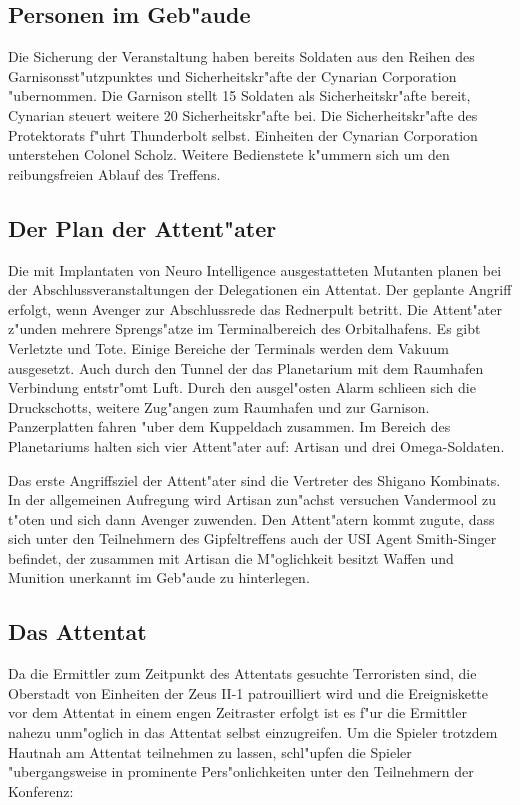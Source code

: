 \subsection{Personen im Geb"aude} 
Die Sicherung der Veranstaltung haben bereits Soldaten aus den Reihen des Garnisonsst"utzpunktes und Sicherheitskr"afte der Cynarian Corporation "ubernommen. Die Garnison stellt 15 Soldaten als Sicherheitskr"afte bereit, Cynarian steuert weitere 20 Sicherheitskr"afte bei. Die Sicherheitskr"afte des Protektorats f"uhrt Thunderbolt selbst. Einheiten der Cynarian Corporation unterstehen Colonel Scholz. Weitere Bedienstete k"ummern sich um den reibungsfreien Ablauf des Treffens.

\subsection{Der Plan der Attent"ater} 
Die mit Implantaten von Neuro Intelligence ausgestatteten Mutanten planen bei der Abschlussveranstaltungen der Delegationen ein Attentat. 
Der geplante Angriff erfolgt, wenn Avenger zur Abschlussrede das Rednerpult betritt. Die Attent"ater z"unden mehrere Sprengs"atze im Terminalbereich des Orbitalhafens. Es gibt Verletzte und Tote. Einige Bereiche der Terminals werden dem Vakuum ausgesetzt. Auch durch den  Tunnel der das Planetarium mit dem Raumhafen Verbindung entstr"omt Luft. Durch den ausgel"osten Alarm schlie\3en sich die Druckschotts, weitere Zug"angen zum Raumhafen und zur Garnison. Panzerplatten fahren "uber dem Kuppeldach zusammen. Im Bereich des Planetariums halten sich vier Attent"ater auf: Artisan und drei Omega-Soldaten.

Das erste Angriffsziel der Attent"ater sind die Vertreter des Shigano Kombinats. In der allgemeinen Aufregung wird Artisan zun"achst versuchen Vandermool zu t"oten und sich dann Avenger zuwenden. Den Attent"atern kommt zugute, dass sich unter den Teilnehmern des Gipfeltreffens auch der USI Agent Smith-Singer befindet, der zusammen mit Artisan die M"oglichkeit besitzt Waffen und Munition unerkannt im Geb"aude zu hinterlegen.

\subsection{Das Attentat} 
Da die Ermittler zum Zeitpunkt des Attentats gesuchte Terroristen sind, die Oberstadt von Einheiten der Zeus II-1 patrouilliert wird und die Ereigniskette vor dem Attentat in einem engen Zeitraster erfolgt ist es f"ur die Ermittler nahezu unm"oglich in das Attentat selbst einzugreifen. Um die Spieler trotzdem Hautnah am Attentat teilnehmen zu lassen, schl"upfen die Spieler "ubergangsweise in prominente Pers"onlichkeiten unter den Teilnehmern der Konferenz:

